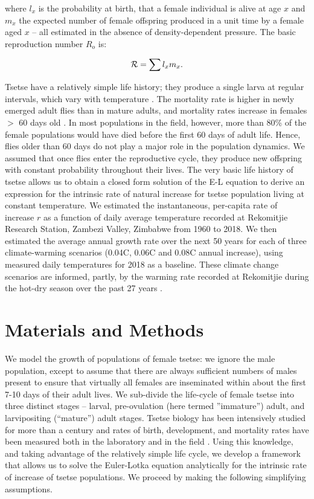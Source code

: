 \documentclass[12pt,a4paper]{article}
\begin{document}
where  $l_{x}$ is the probability at birth, that a female individual is alive at age $x$ and $m_{x}$ the expected number of female offspring produced in a unit time by a female aged $x$ -- all estimated in the absence of density-dependent pressure.
The basic reproduction number $R_{o}$ is:

\begin{equation}
\label{eulerRepNumber}
{\cal R}= \sum l_{x}m_{x}. 
\end{equation}

Tsetse have a relatively simple life history; they produce a single larva at regular intervals, which vary with temperature \cite{hargrove2003tsetse}. The mortality rate is higher in newly emerged adult flies than in mature adults, and mortality rates increase in females $>$ 60 days old \cite{hargrove2020model}. In most populations in the field, however, more than 80\% of the female populations would have died before the first 60 days of adult life. Hence, flies older than 60 days do not play a major role in the population dynamics. We assumed that once flies enter the reproductive cycle, they produce new offspring with constant probability throughout their lives. The very basic life history of tsetse allows us to obtain a closed form solution of the E-L equation to derive an expression for the intrinsic rate of natural increase for tsetse population living at constant temperature. We estimated the instantaneous, per-capita rate of increase $r$ as a function of daily average temperature recorded at Rekomitjie Research Station, Zambezi Valley, Zimbabwe from 1960 to 2018. We then estimated the average annual growth rate over the next 50 years for each of three climate-warming scenarios (0.04\textdegree C, 0.06\textdegree C and 0.08\textdegree C annual increase), using measured daily temperatures for 2018 as a baseline. These climate change scenarios are informed, partly, by the warming rate recorded at Rekomitjie during the hot-dry season over the past 27 years \cite{Lord2018}.    
	
\section*{Materials and Methods}
We model the growth of populations of female tsetse: we ignore the male population, except to assume that there are always sufficient numbers of males present to ensure that virtually all females are inseminated within about the first 7-10 days of their adult lives. We sub-divide the life-cycle of female tsetse into three distinct stages – larval, pre-ovulation (here termed ''immature'') adult,  and larvipositing (``mature'') adult stages. Tsetse biology has been intensively studied for more than a century and rates of birth, development, and mortality rates have been measured both  in  the laboratory and  in the field \cite{Rogers2011,Hargrove2004a,Jarry2007,Hargrove2011,Hargrove2019a}. Using this knowledge, and taking advantage of the relatively simple life cycle, we develop a framework that allows us to solve the Euler-Lotka equation analytically for the intrinsic rate of increase of tsetse populations. We proceed by making the following simplifying assumptions.
\end{document}
